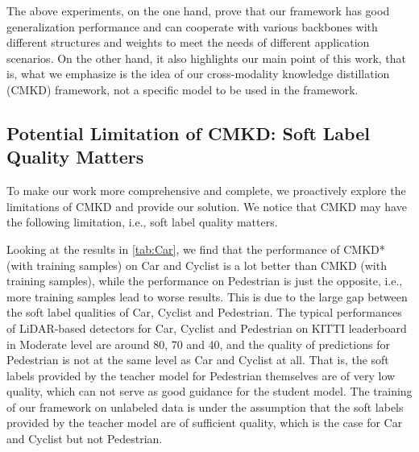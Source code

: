 \documentclass[runningheads]{llncs}
\begin{document}
The above experiments, on the one hand, prove that our framework has good generalization performance and can cooperate with various backbones with different structures and weights to meet the needs of different application scenarios. 
On the other hand, it also highlights our main point of this work, that is,
what we emphasize is the idea of our cross-modality knowledge distillation (CMKD) framework, not a specific model to be used in the framework.

\subsection{Potential Limitation of CMKD: Soft Label Quality Matters}
\label{sec:limitation}
To make our work more comprehensive and complete, we proactively explore the limitations of CMKD and provide our solution. 
We notice that CMKD may have the following limitation, i.e., soft label quality matters.

Looking at the results in \cref{tab:Car}, we find that the performance of CMKD* (with  training samples) on Car and Cyclist is a lot better than CMKD (with  training samples), while the performance on Pedestrian is just the opposite, i.e., more training samples lead to worse results.
This is due to the large gap between the soft label qualities of Car, Cyclist and Pedestrian.
The typical performances of LiDAR-based detectors for Car, Cyclist and Pedestrian on KITTI leaderboard in Moderate level are around 80, 70 and 40, and the quality of predictions for Pedestrian is not at the same level as Car and Cyclist at all.
That is, the soft labels provided by the teacher model for Pedestrian themselves are of very low quality, which can not serve as good guidance for the student model.
The training of our framework on unlabeled data is under the assumption that the soft labels provided by the teacher model are of sufficient quality, which is the case for Car and Cyclist but not Pedestrian.
\end{document}
